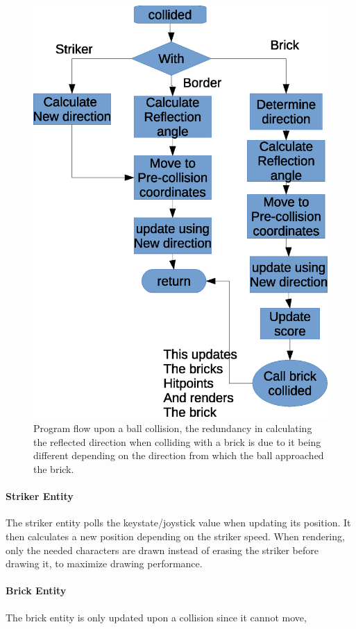 \begin{figure}
	\center
	\includegraphics[scale=0.5]{pictures/ball_flow.eps}
	\caption{Program flow upon a ball collision, the redundancy in calculating the reflected
	direction when colliding with a brick is due to it being different depending on the direction
	from which the ball approached the brick.}
	\label{ball_flow}
\end{figure}

\paragraph{Striker Entity}
The striker entity polls the keystate/joystick value when updating its position. It then 
calculates a new position depending on the striker speed. When rendering, only the needed
characters are drawn instead of erasing the striker before drawing it, to maximize drawing
performance.

\paragraph{Brick Entity}
The brick entity is only updated upon a collision since it cannot move, 
